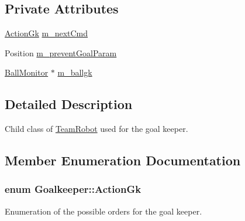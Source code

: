 \subsection*{Private Attributes}
\begin{DoxyCompactItemize}
\item 
\hyperlink{classGoalkeeper_a25db0bed632b4bdb87532b0fbbf45855}{ActionGk} \hyperlink{classGoalkeeper_a84e9e9f514d0ace81c95e03ee832aea8}{m\_\-nextCmd}
\item 
Position \hyperlink{classGoalkeeper_a04b3ca2b51698e36928ccce7569842eb}{m\_\-preventGoalParam}
\item 
\hyperlink{classBallMonitor}{BallMonitor} $\ast$ \hyperlink{classGoalkeeper_a8fc8e75ffc8d3582d293b0fe42a0c073}{m\_\-ballgk}
\end{DoxyCompactItemize}


\subsection{Detailed Description}
Child class of \hyperlink{classTeamRobot}{TeamRobot} used for the goal keeper. 

\subsection{Member Enumeration Documentation}
\hypertarget{classGoalkeeper_a25db0bed632b4bdb87532b0fbbf45855}{
\subsubsection[{ActionGk}]{\setlength{\rightskip}{0pt plus 5cm}enum {\bf Goalkeeper::ActionGk}}}
\label{classGoalkeeper_a25db0bed632b4bdb87532b0fbbf45855}


Enumeration of the possible orders for the goal keeper. 

